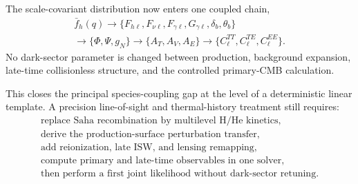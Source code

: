 The scale-covariant distribution now enters one coupled chain,
\begin{equation}
 \boxed{
 \begin{gathered}
 \bar f_h(q)
 \longrightarrow
 \{F_{h\ell},F_{\nu\ell},F_{\gamma\ell},G_{\gamma\ell},\delta_b,\theta_b\}
 \\
 \longrightarrow
 \{\Phi,\Psi,g_N\}
 \longrightarrow
 \{A_T,A_V,A_E\}
 \longrightarrow
 \{C_\ell^{TT},C_\ell^{TE},C_\ell^{EE}\}.
 \end{gathered}}
 \label{eq:pcmb-result-chain}
\end{equation}
No dark-sector parameter is changed between production, background expansion, late-time collisionless structure, and the controlled primary-CMB calculation.

This closes the principal species-coupling gap at the level of a deterministic linear template.  A precision line-of-sight and thermal-history treatment still requires:
\begin{equation}
 \boxed{
 \begin{gathered}
 \text{replace Saha recombination by multilevel H/He kinetics},\\
 \text{derive the production-surface perturbation transfer},\\
 \text{add reionization, late ISW, and lensing remapping},\\
 \text{compute primary and late-time observables in one solver},\\
 \text{then perform a first joint likelihood without dark-sector retuning}.
 \end{gathered}}
 \label{eq:pcmb-open-requirements}
\end{equation}
